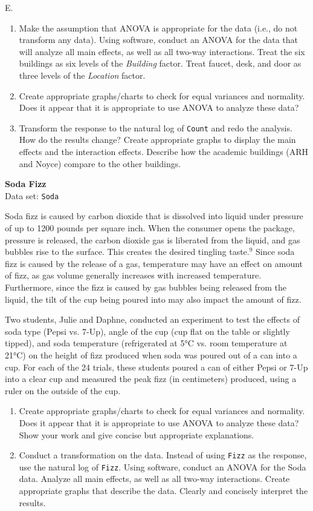 \documentclass[
]{report}
\newcounter{excount}
\renewcommand{\theexcount}{E\arabic{excount}}
\begin{document}
\begin{list}{\theexcount.}{ \setlength{\itemsep}{1.2em}}
  \begin{enumerate}
    \item Make the assumption that ANOVA is appropriate for the data (i.e., do not transform any data). Using software, conduct an ANOVA for the data that will analyze all main effects, as well as all two-way interactions. Treat the six buildings as six levels of the \textit{Building} factor. Treat faucet, desk, and door as three levels of the \textit{Location} factor.
    \item Create appropriate graphs/charts to check for equal variances and normality. Does it appear that it is appropriate to use ANOVA to analyze these data?
    \item Transform the response to the natural log of \texttt{Count} and redo the analysis. How do the results change? Create appropriate graphs to display the main effects and the interaction effects. Describe how the academic buildings (ARH and Noyce) compare to the other buildings.
  \end{enumerate}

  \item \textbf{Soda Fizz}\\
  Data set: \texttt{Soda}

Soda fizz is caused by carbon dioxide that is dissolved into liquid under pressure of up to 1200 pounds per square inch. When the consumer opens the package, pressure is released, the carbon dioxide gas is liberated from the liquid, and gas bubbles rise to the surface. This creates the desired tingling taste.$^9$ Since soda fizz is caused by the release of a gas, temperature may have an effect on amount of fizz, as gas volume generally increases with increased temperature. Furthermore, since the fizz is caused by gas bubbles being released from the liquid, the tilt of the cup being poured into may also impact the amount of fizz.

Two students, Julie and Daphne, conducted an experiment to test the effects of soda type (Pepsi vs. 7-Up), angle of the cup (cup flat on the table or slightly tipped), and soda temperature (refrigerated at 5°C vs. room temperature at 21°C) on the height of fizz produced when soda was poured out of a can into a cup. For each of the 24 trials, these students poured a can of either Pepsi or 7-Up into a clear cup and measured the peak fizz (in centimeters) produced, using a ruler on the outside of the cup.

  \begin{enumerate}
    \item Create appropriate graphs/charts to check for equal variances and normality. Does it appear that it is appropriate to use ANOVA to analyze these data? Show your work and give concise but appropriate explanations.
    \item Conduct a transformation on the data. Instead of using \texttt{Fizz} as the response, use the natural log of \texttt{Fizz}. Using software, conduct an ANOVA for the Soda data. Analyze all main effects, as well as all two-way interactions. Create appropriate graphs that describe the data. Clearly and concisely interpret the results.
  \end{enumerate}


\end{list}
\end{document}
